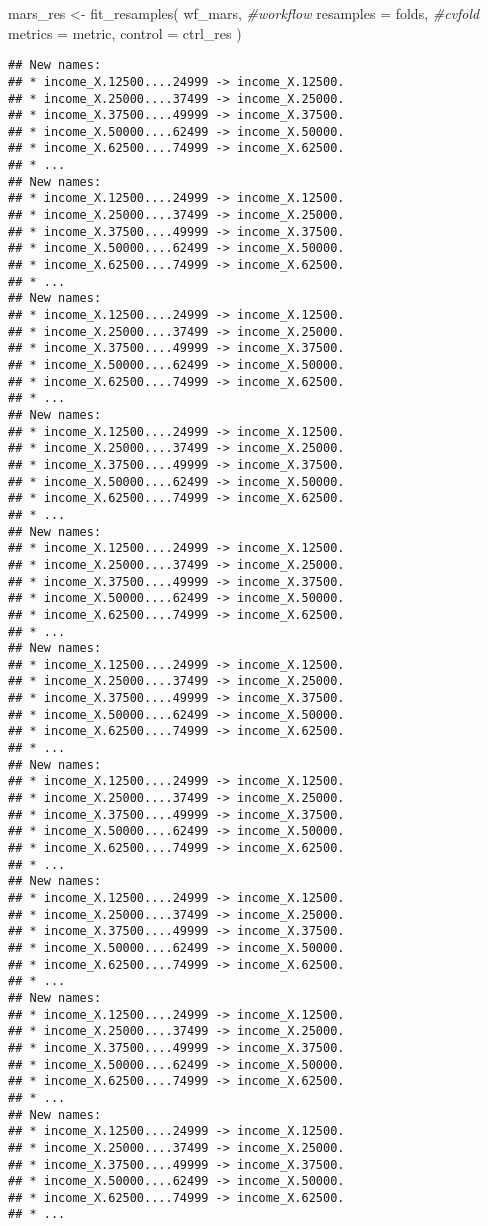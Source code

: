 \documentclass[
]{article}
\newenvironment{Shaded}{\begin{snugshade}}{\end{snugshade}}
\newcommand{\AttributeTok}[1]{\textcolor[rgb]{0.77,0.63,0.00}{#1}}
\newcommand{\CommentTok}[1]{\textcolor[rgb]{0.56,0.35,0.01}{\textit{#1}}}
\newcommand{\FunctionTok}[1]{\textcolor[rgb]{0.00,0.00,0.00}{#1}}
\newcommand{\NormalTok}[1]{#1}
\newcommand{\OtherTok}[1]{\textcolor[rgb]{0.56,0.35,0.01}{#1}}
\begin{document}
\begin{Shaded}
\begin{Highlighting}[]
\NormalTok{mars\_res }\OtherTok{\textless{}{-}} 
  \FunctionTok{fit\_resamples}\NormalTok{(}
\NormalTok{    wf\_mars, }\CommentTok{\#workflow}
    \AttributeTok{resamples =}\NormalTok{ folds, }\CommentTok{\#cvfold}
    \AttributeTok{metrics =}\NormalTok{ metric,}
    \AttributeTok{control =}\NormalTok{ ctrl\_res}
\NormalTok{  )}
\end{Highlighting}
\end{Shaded}

\begin{verbatim}
## New names:
## * income_X.12500....24999 -> income_X.12500.
## * income_X.25000....37499 -> income_X.25000.
## * income_X.37500....49999 -> income_X.37500.
## * income_X.50000....62499 -> income_X.50000.
## * income_X.62500....74999 -> income_X.62500.
## * ...
## New names:
## * income_X.12500....24999 -> income_X.12500.
## * income_X.25000....37499 -> income_X.25000.
## * income_X.37500....49999 -> income_X.37500.
## * income_X.50000....62499 -> income_X.50000.
## * income_X.62500....74999 -> income_X.62500.
## * ...
## New names:
## * income_X.12500....24999 -> income_X.12500.
## * income_X.25000....37499 -> income_X.25000.
## * income_X.37500....49999 -> income_X.37500.
## * income_X.50000....62499 -> income_X.50000.
## * income_X.62500....74999 -> income_X.62500.
## * ...
## New names:
## * income_X.12500....24999 -> income_X.12500.
## * income_X.25000....37499 -> income_X.25000.
## * income_X.37500....49999 -> income_X.37500.
## * income_X.50000....62499 -> income_X.50000.
## * income_X.62500....74999 -> income_X.62500.
## * ...
## New names:
## * income_X.12500....24999 -> income_X.12500.
## * income_X.25000....37499 -> income_X.25000.
## * income_X.37500....49999 -> income_X.37500.
## * income_X.50000....62499 -> income_X.50000.
## * income_X.62500....74999 -> income_X.62500.
## * ...
## New names:
## * income_X.12500....24999 -> income_X.12500.
## * income_X.25000....37499 -> income_X.25000.
## * income_X.37500....49999 -> income_X.37500.
## * income_X.50000....62499 -> income_X.50000.
## * income_X.62500....74999 -> income_X.62500.
## * ...
## New names:
## * income_X.12500....24999 -> income_X.12500.
## * income_X.25000....37499 -> income_X.25000.
## * income_X.37500....49999 -> income_X.37500.
## * income_X.50000....62499 -> income_X.50000.
## * income_X.62500....74999 -> income_X.62500.
## * ...
## New names:
## * income_X.12500....24999 -> income_X.12500.
## * income_X.25000....37499 -> income_X.25000.
## * income_X.37500....49999 -> income_X.37500.
## * income_X.50000....62499 -> income_X.50000.
## * income_X.62500....74999 -> income_X.62500.
## * ...
## New names:
## * income_X.12500....24999 -> income_X.12500.
## * income_X.25000....37499 -> income_X.25000.
## * income_X.37500....49999 -> income_X.37500.
## * income_X.50000....62499 -> income_X.50000.
## * income_X.62500....74999 -> income_X.62500.
## * ...
## New names:
## * income_X.12500....24999 -> income_X.12500.
## * income_X.25000....37499 -> income_X.25000.
## * income_X.37500....49999 -> income_X.37500.
## * income_X.50000....62499 -> income_X.50000.
## * income_X.62500....74999 -> income_X.62500.
## * ...
\end{verbatim}
\end{document}
